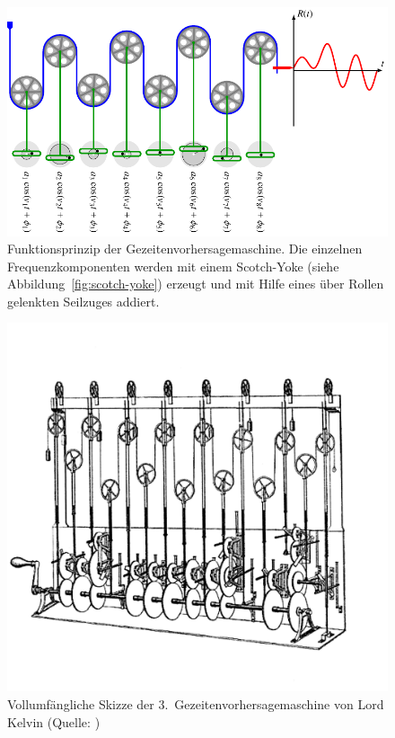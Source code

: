 \begin{figure}
	\centering
	\includegraphics{papers/gezeiten/images/sy.pdf}
	\caption{Funktionsprinzip der Gezeitenvorhersagemaschine.
	Die einzelnen Frequenzkomponenten werden mit einem Scotch-Yoke
	(siehe Abbildung~\ref{fig:scotch-yoke})
	erzeugt und mit Hilfe eines über Rollen gelenkten Seilzuges
	addiert. }
	\label{fig:skizze-maschine}
\end{figure}

\begin{figure}
	\centering
	\includegraphics[width=\textwidth]{"papers/gezeiten/Thompson Skizze"}
	\caption{Vollumfängliche Skizze der 3.~Gezeitenvorhersagemaschine von
		Lord Kelvin (Quelle: \cite{gezeiten:Thompson})
	\label{fig:thompson-skizze}}
\end{figure}

